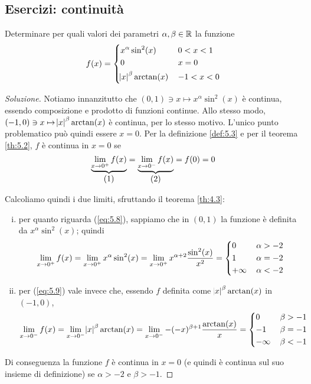 \subsection{Esercizi: continuità}
\begin{exercise}
    \label{ex:5.3}
    Determinare per quali valori dei parametri $\alpha, \beta\in\amsbb{R}$ la funzione
    \[
    f(x) = \begin{dcases}
        x^\alpha\sin^2(x)\, & 0<x<1\\
        0\, & x=0\\
        \abs{x}^\beta \arctan(x)\, & -1<x<0
    \end{dcases}
    \]
\end{exercise}
\begin{proof}[Soluzione]
    Notiamo innanzitutto che $(0,1)\ni x \mapsto x^\alpha \sin^2(x)$ è continua, essendo composizione e prodotto di funzioni continue. Allo stesso modo, $(-1, 0)\ni x \mapsto \abs{x}^\beta \arctan(x)$ è continua, per lo stesso motivo. L'unico punto problematico può quindi essere $x=0$. Per la definizione \ref{def:5.3} e per il teorema \ref{th:5.2}, $f$ è continua in $x=0$ se
    \[
    \underbrace{\lim_{x\to 0^+} f(x)}_{\stepcounter{equation}\mbox{(\theequation)}} = \underbrace{\lim_{x\to 0^-} f(x)}_{\stepcounter{equation}\mbox{(\theequation)}} = f(0) = 0
    \]
    \addtocounter{equation}{-2}\label{eq:5.8}
    \addtocounter{equation}{0}\label{eq:5.9}
    Calcoliamo quindi i due limiti, sfruttando il teorema \ref{th:4.3}:
    \begin{enumerate}[(i)]
        \item per quanto riguarda (\ref{eq:5.8}), sappiamo che in $(0,1)$ la funzione è definita da $x^\alpha\sin^2(x)$; quindi
        \[
        \lim_{x\to 0^+}f(x) = \lim_{x\to 0^+} x^\alpha \sin^2(x) = \lim_{x\to 0^+} x^{\alpha +2} \frac{\sin^2(x)}{x^2} = \begin{dcases}
            0\, & \alpha>-2\\
            1\, & \alpha = -2\\
            +\infty\, & \alpha<-2
        \end{dcases}
        \]
        \item per (\ref{eq:5.9}) vale invece che, essendo $f$ definita come $\abs{x}^\beta \arctan(x)$ in $(-1,0)$,
        \[
        \lim_{x\to 0^-} f(x) = \lim_{x\to 0^-} \abs{x}^\beta \arctan(x) = \lim_{x\to 0^-} -(-x)^{\beta+1} \frac{\arctan(x)}{x}= \begin{dcases}
            0\, & \beta>-1\\
            -1\, & \beta=-1\\
            -\infty\, & \beta<-1
        \end{dcases}
        \]
    \end{enumerate}
    Di conseguenza la funzione $f$ è continua in $x=0$ (e quindi è continua sul suo insieme di definizione) se $\alpha>-2$ e $\beta>-1$.
\end{proof}
\newpage